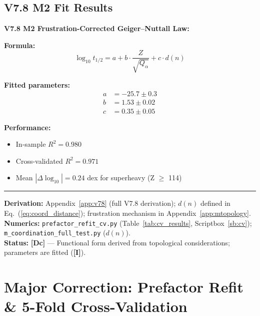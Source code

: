 \documentclass[11pt,a4paper]{article}
\newcommand{\tagI}{\textcolor{orange!80!black}{\textbf{[I]}}}
\newcommand{\tagDc}{\textcolor{blue!70!black}{\textbf{[Dc]}}}
\begin{document}
\subsection{V7.8 M2 Fit Results}

\begin{resultbox}
\textbf{V7.8 M2 Frustration-Corrected Geiger--Nuttall Law:}

\textbf{Formula:}
\begin{equation}
    \log_{10} t_{1/2} = a + b \cdot \frac{Z}{\sqrt{Q_\alpha}} + c \cdot d(n)
    \label{eq:v78_m2}
\end{equation}

\textbf{Fitted parameters:}
\begin{align}
    a &= -25.7 \pm 0.3 \\
    b &= 1.53 \pm 0.02 \\
    c &= 0.35 \pm 0.05
\end{align}

\textbf{Performance:}
\begin{itemize}[nosep]
    \item In-sample $R^2 = 0.980$
    \item Cross-validated $R^2 = 0.971$
    \item Mean $|\Delta \log_{10}| = 0.24$ dex for superheavy (Z $\geq$ 114)
\end{itemize}

\vspace{0.3em}\hrule\vspace{0.3em}
\textbf{Derivation:} Appendix~\ref{app:v78} (full V7.8 derivation); $d(n)$ defined in Eq.~(\ref{eq:coord_distance}); frustration mechanism in Appendix~\ref{app:mtopology}.\\
\textbf{Numerics:} \texttt{prefactor\_refit\_cv.py} (Table~\ref{tab:cv_results}, Scriptbox~\ref{sb:cv}); \texttt{m\_coordination\_full\_test.py} ($d(n)$).\\
\textbf{Status:} \tagDc{} --- Functional form derived from topological considerations; parameters are fitted (\tagI{}).
\end{resultbox}

\section{Major Correction: Prefactor Refit \& 5-Fold Cross-Validation}
\label{sec:prefactor_refit}
\end{document}
